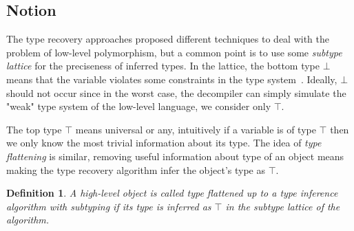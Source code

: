 \documentclass[compsoc,conference,a4paper,10pt,times]{IEEEtran}
\newtheorem{definition}{Definition}
\begin{document}
\subsection{Notion}
\noindent
The type recovery approaches proposed different techniques to deal with the problem of
low-level polymorphism, but a common point
is to use some \emph{subtype lattice}
for the preciseness of inferred types. In the lattice, the bottom type $\bot$ means
that the variable violates some constraints in the type system~\cite{lee_tie_2011}.
Ideally, $\bot$ should not occur since in the worst case, the decompiler can simply
simulate the "weak" type system of the low-level language, we consider only $\top$.

The top type $\top$ means universal or any, intuitively if a variable is of type $\top$ then we only
know the most trivial information about its type.
The idea of \emph{type flattening} is similar, removing useful information about type
of an object means making the type recovery algorithm infer the object's type as $\top$.

\begin{definition}
  A high-level object is called type flattened up to a type inference algorithm with subtyping
  if its type is inferred as $\top$ in the subtype lattice of the algorithm.
\end{definition}
\end{document}
